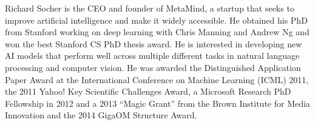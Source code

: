 Richard Socher is the CEO and founder of MetaMind, a startup that seeks to improve artificial intelligence and make it widely accessible. He obtained his PhD from Stanford working on deep learning with Chris Manning and Andrew Ng and won the best Stanford CS PhD thesis award. He is interested in developing new AI models that perform well across multiple different tasks in natural language processing and computer vision. He was awarded the Distinguished Application Paper Award at the International Conference on Machine Learning (ICML) 2011, the 2011 Yahoo! Key Scientific Challenges Award, a Microsoft Research PhD Fellowship in 2012 and a 2013 ``Magic Grant'' from the Brown Institute for Media Innovation and the 2014 GigaOM Structure Award.
